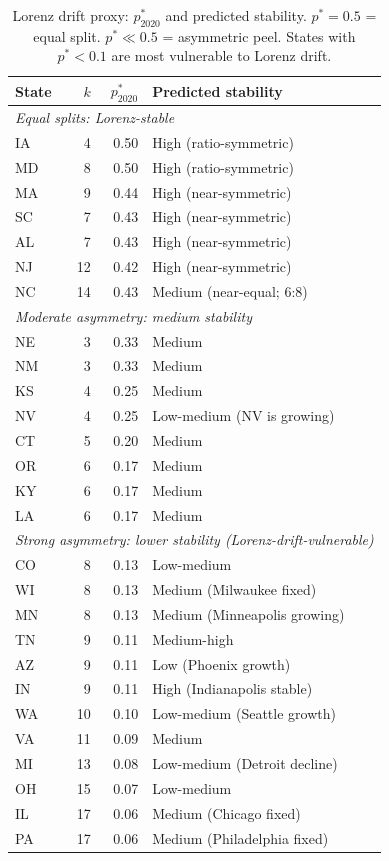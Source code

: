 \begin{table}[h]
\centering
\caption{Lorenz drift proxy: $p^*_{2020}$ and predicted stability.
  $p^* = 0.5$ = equal split. $p^* \ll 0.5$ = asymmetric peel.
  States with $p^* < 0.1$ are most vulnerable to Lorenz drift.}
\label{tab:lorenz-proxy}
\small
\begin{tabular}{l r r l}
\toprule
State & $k$ & $p^*_{2020}$ & Predicted stability \\
\midrule
\multicolumn{4}{l}{\textit{Equal splits: Lorenz-stable}} \\
IA  & 4 & 0.50 & High (ratio-symmetric) \\
MD  & 8 & 0.50 & High (ratio-symmetric) \\
MA  & 9 & 0.44 & High (near-symmetric) \\
SC  & 7 & 0.43 & High (near-symmetric) \\
AL  & 7 & 0.43 & High (near-symmetric) \\
NJ  & 12 & 0.42 & High (near-symmetric) \\
NC  & 14 & 0.43 & Medium (near-equal; 6:8) \\
\midrule
\multicolumn{4}{l}{\textit{Moderate asymmetry: medium stability}} \\
NE  & 3 & 0.33 & Medium \\
NM  & 3 & 0.33 & Medium \\
KS  & 4 & 0.25 & Medium \\
NV  & 4 & 0.25 & Low-medium (NV is growing) \\
CT  & 5 & 0.20 & Medium \\
OR  & 6 & 0.17 & Medium \\
KY  & 6 & 0.17 & Medium \\
LA  & 6 & 0.17 & Medium \\
\midrule
\multicolumn{4}{l}{\textit{Strong asymmetry: lower stability (Lorenz-drift-vulnerable)}} \\
CO  & 8 & 0.13 & Low-medium \\
WI  & 8 & 0.13 & Medium (Milwaukee fixed) \\
MN  & 8 & 0.13 & Medium (Minneapolis growing) \\
TN  & 9 & 0.11 & Medium-high \\
AZ  & 9 & 0.11 & Low (Phoenix growth) \\
IN  & 9 & 0.11 & High (Indianapolis stable) \\
WA  & 10 & 0.10 & Low-medium (Seattle growth) \\
VA  & 11 & 0.09 & Medium \\
MI  & 13 & 0.08 & Low-medium (Detroit decline) \\
OH  & 15 & 0.07 & Low-medium \\
IL  & 17 & 0.06 & Medium (Chicago fixed) \\
PA  & 17 & 0.06 & Medium (Philadelphia fixed) \\
\bottomrule
\end{tabular}
\end{table}

